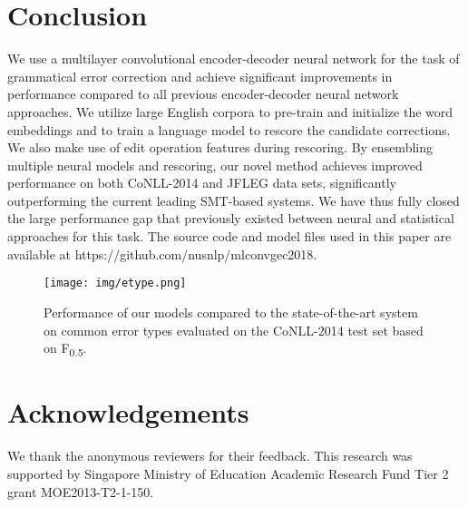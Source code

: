 \documentclass[letterpaper]{article} \usepackage{aaai18}  \usepackage{times}  \usepackage{helvet}  \usepackage{courier}  \usepackage{url}  \usepackage{graphicx}  \frenchspacing  \setlength{\pdfpagewidth}{8.5in}  \setlength{\pdfpageheight}{11in}  \usepackage{amssymb}
\begin{document}
\section{Conclusion}
We use a multilayer convolutional encoder-decoder neural network for the task of grammatical error correction and achieve significant improvements in performance compared to all previous encoder-decoder neural network approaches. We utilize large English corpora to pre-train and initialize the word embeddings and to train a language model to rescore the candidate corrections. We also make use of edit operation features during rescoring. By ensembling multiple neural models and rescoring, our novel method achieves improved performance on both CoNLL-2014 and JFLEG data sets, significantly outperforming the current leading SMT-based systems. We have thus fully closed the large performance gap that previously existed between neural and statistical approaches for this task. The source code and model files used in this paper are available at https://github.com/nusnlp/mlconvgec2018.

\begin{figure}[t]
  \texttt{[image: img/etype.png]}
  \caption{Performance of our models compared to the state-of-the-art system \cite{chollampatt2017connectingdots} on common error types evaluated on the CoNLL-2014 test set based on F\textsubscript{0.5}.}
  \label{fig:etypescores}
\end{figure}

\section*{Acknowledgements}
We thank the anonymous reviewers for their feedback. This research was supported by
Singapore Ministry of Education Academic Research
Fund Tier 2 grant MOE2013-T2-1-150.



\end{document}
